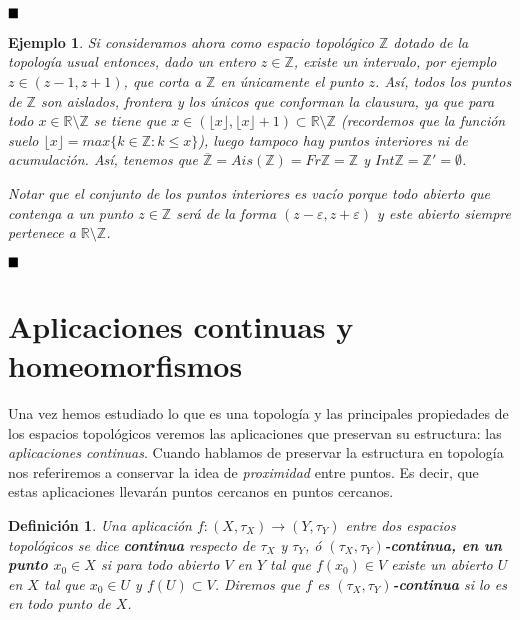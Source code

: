 \documentclass[12pt]{article}
\newtheorem{definition}[theorem]{Definición}
\newtheorem{example}{Ejemplo}[theorem]
\begin{document}
$\hfill \blacksquare$

\begin{example}Si consideramos ahora como espacio topológico $\mathbb{Z}$ dotado de la topología usual entonces, dado un entero $z \in \mathbb{Z}$, existe un intervalo, por ejemplo $z \in (z-1, z+1)$, que corta a $\mathbb{Z}$ en únicamente el punto $z$. Así, todos los puntos de $\mathbb{Z}$ son aislados, frontera y los únicos que conforman la clausura, ya que para todo $x \in \mathbb{R}\setminus \mathbb{Z}$ se tiene que $x \in (\lfloor x \rfloor, \lfloor x \rfloor + 1) \subset \mathbb{R} \setminus \mathbb{Z}$ (recordemos que la función suelo $\lfloor x \rfloor = max\lbrace k \in \mathbb{Z}: k\leq x \rbrace$), luego tampoco hay puntos interiores ni de acumulación. Así, tenemos que $\overline{\mathbb{Z}} = Ais (\mathbb{Z}) = Fr\mathbb{Z} = \mathbb{Z}$ y $Int\mathbb{Z} = \mathbb{Z}' = \emptyset$.

Notar que el conjunto de los puntos interiores es vacío porque todo abierto que contenga a un punto $z \in \mathbb{Z}$ será de la forma $(z-\varepsilon, z+\varepsilon)$ y este abierto siempre pertenece a $\mathbb{R}\setminus \mathbb{Z}$.
\end{example}

$\hfill \blacksquare$

\section{Aplicaciones continuas y homeomorfismos}
Una vez hemos estudiado lo que es una topología y las principales propiedades de los espacios topológicos veremos las aplicaciones que preservan su estructura: las \textit{aplicaciones continuas}. Cuando hablamos de preservar la estructura en topología nos referiremos a conservar la idea de \textit{proximidad} entre puntos. Es decir, que estas aplicaciones llevarán puntos cercanos en puntos cercanos. 

\begin{definition}Una aplicación $f \colon (X, \tau_X) \longrightarrow (Y, \tau_Y)$ entre dos espacios topológicos se dice \textbf{continua} respecto de $\tau_X$ y $\tau_Y$, ó \textbf{$(\tau_X, \tau_Y)$-continua, en un punto $x_0 \in X$} si para todo abierto $V$ en $Y$ tal que $f(x_0) \in V$ existe un abierto $U$ en $X$ tal que $x_0 \in U$ y $f(U) \subset V$. Diremos que $f$ es \textbf{$(\tau_X, \tau_Y)$-continua} si lo es en todo punto de $X$.
\end{definition}
\begin{center}
\end{center}
\end{document}
